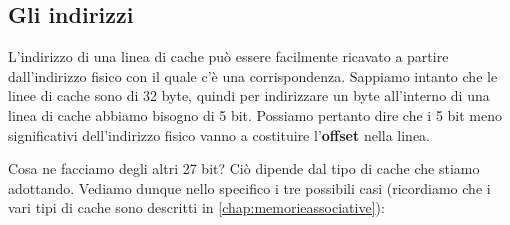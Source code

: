 \documentclass[11pt]{book}
\begin{document}
\subsection{Gli indirizzi}

L'indirizzo di una linea di cache pu\`o essere facilmente ricavato a
partire dall'indirizzo fisico con il quale c'\`e una
corrispondenza. Sappiamo intanto che le linee di cache sono di 32
byte, quindi per indirizzare un byte all'interno di una linea di cache
abbiamo bisogno di 5 bit. Possiamo pertanto dire che i 5 bit meno
significativi dell'indirizzo fisico vanno a costituire
l'\textbf{offset} nella linea.

Cosa ne facciamo degli altri 27 bit? Ci\`o dipende dal tipo di cache
che stiamo adottando. Vediamo dunque nello specifico i tre possibili
casi (ricordiamo che i vari tipi di cache sono descritti in
\ref{chap:memorieassociative}):
\end{document}
